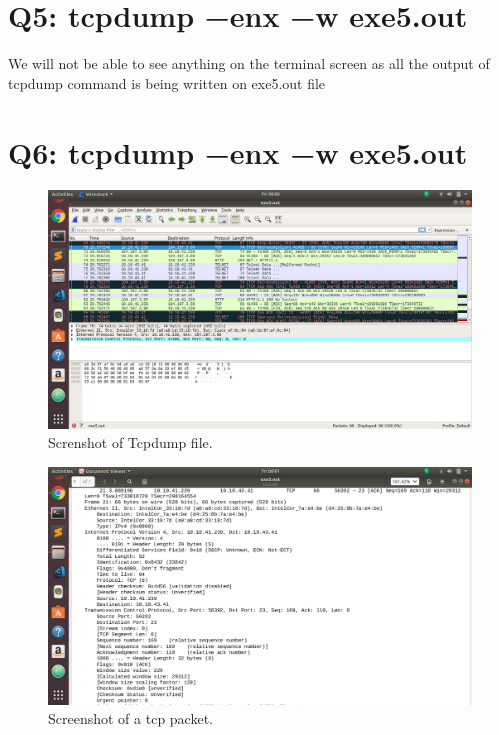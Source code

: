 \documentclass{article}
\begin{document}
 
\section{Q5: tcpdump −enx −w exe5.out}
We will not be able to see anything on the terminal screen as all the output of tcpdump command is being written on exe5.out file

\section{Q6: tcpdump −enx −w exe5.out}

\begin{figure}[H]
 \centering
 \includegraphics[width=1.0\textwidth]{../Q6/exe5.png}
 \caption{\label{fig:EXE5.OUT}Screnshot of Tcpdump file.}
 \end{figure}
 \begin{figure}[H]
 \centering
 \includegraphics[width=1.0\textwidth]{../Q6/tcp2.png}
 \caption{\label{fig:Tcp Packet}Screenshot of a tcp packet.}
 \end{figure}
\end{document}
